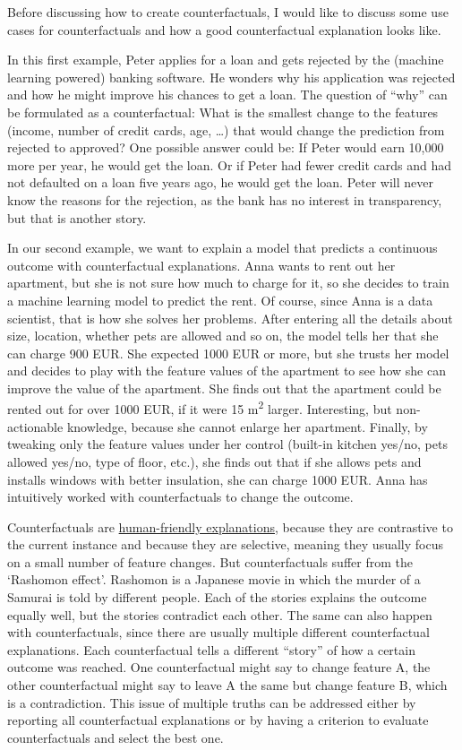 \documentclass[
  10pt,
]{scrbook}
\begin{document}
Before discussing how to create counterfactuals, I would like to discuss some use cases for counterfactuals and how a good counterfactual explanation looks like.

In this first example, Peter applies for a loan and gets rejected by the (machine learning powered) banking software.
He wonders why his application was rejected and how he might improve his chances to get a loan.
The question of ``why'' can be formulated as a counterfactual:
What is the smallest change to the features (income, number of credit cards, age, \ldots) that would change the prediction from rejected to approved?
One possible answer could be:
If Peter would earn 10,000 more per year, he would get the loan.
Or if Peter had fewer credit cards and had not defaulted on a loan five years ago, he would get the loan.
Peter will never know the reasons for the rejection, as the bank has no interest in transparency, but that is another story.

In our second example, we want to explain a model that predicts a continuous outcome with counterfactual explanations.
Anna wants to rent out her apartment, but she is not sure how much to charge for it, so she decides to train a machine learning model to predict the rent.
Of course, since Anna is a data scientist, that is how she solves her problems.
After entering all the details about size, location, whether pets are allowed and so on, the model tells her that she can charge 900 EUR.
She expected 1000 EUR or more, but she trusts her model and decides to play with the feature values of the apartment to see how she can improve the value of the apartment.
She finds out that the apartment could be rented out for over 1000 EUR, if it were 15 m\textsuperscript{2} larger.
Interesting, but non-actionable knowledge, because she cannot enlarge her apartment.
Finally, by tweaking only the feature values under her control (built-in kitchen yes/no, pets allowed yes/no, type of floor, etc.), she finds out that if she allows pets and installs windows with better insulation, she can charge 1000 EUR.
Anna has intuitively worked with counterfactuals to change the outcome.

Counterfactuals are \protect\hyperlink{good-explanation}{human-friendly explanations}, because they are contrastive to the current instance and because they are selective, meaning they usually focus on a small number of feature changes.
But counterfactuals suffer from the `Rashomon effect'.
Rashomon is a Japanese movie in which the murder of a Samurai is told by different people.
Each of the stories explains the outcome equally well, but the stories contradict each other.
The same can also happen with counterfactuals, since there are usually multiple different counterfactual explanations.
Each counterfactual tells a different ``story'' of how a certain outcome was reached.
One counterfactual might say to change feature A, the other counterfactual might say to leave A the same but change feature B, which is a contradiction.
This issue of multiple truths can be addressed either by reporting all counterfactual explanations or by having a criterion to evaluate counterfactuals and select the best one.
\end{document}
